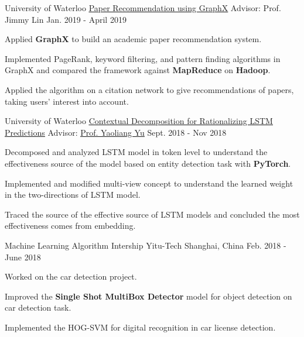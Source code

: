 \begin{cventries}
  \cventry
    {University of Waterloo}
    {{\href{https://github.com/amyxie361/CS651_Paper_recommendation}{\underline{Paper Recommendation using GraphX}}}} %
    {Advisor: Prof. Jimmy Lin} %
    {Jan. 2019 - April 2019} %
    {
      \begin{cvitems} %
        \item {Applied \textbf{GraphX} to build an academic paper recommendation system.}
        \item {Implemented PageRank, keyword filtering, and pattern finding algorithms in GraphX and compared the framework against \textbf{MapReduce} on \textbf{Hadoop}.}
        \item {Applied the algorithm on a citation network to give recommendations of papers, taking users’ interest into account. }
      \end{cvitems}
    }

\cventry
    {University of Waterloo}
    {{\href{https://github.com/amyxie361/CS886}{\underline{Contextual Decomposition for Rationalizing LSTM Predictions}}}} %
    {Advisor: {\href{https://cs.uwaterloo.ca/~y328yu/}{\underline{Prof. Yaoliang Yu}}}} %
    {Sept. 2018 - Nov 2018} %
    {
      \begin{cvitems} %
        \item {Decomposed and analyzed LSTM model in token level to understand the effectiveness source of the model based on entity detection task with \textbf{PyTorch}.}
        \item {Implemented and modified multi-view concept to understand the learned weight in the two-directions of LSTM model.}
        \item {Traced the source of the effective source of LSTM models and concluded the most effectiveness comes from embedding.}
      \end{cvitems}
    }
    
    \cventry
    {Machine Learning Algorithm Intership} %
    {Yitu-Tech} %
    {Shanghai, China} %
    {Feb. 2018 - June 2018} %
    {
      \begin{cvitems} %
       \item {Worked on the car detection project.}
        \item {Improved the  \textbf{Single Shot MultiBox Detector} model for object detection on car detection task.}
        \item {Implemented the HOG-SVM for digital recognition in car license detection.}
      \end{cvitems}
    }
    

\end{cventries}
